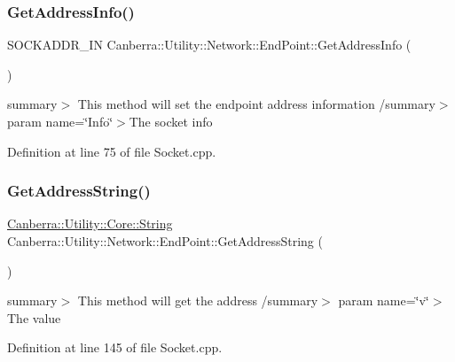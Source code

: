 \subsubsection{\texorpdfstring{Get\+Address\+Info()}{GetAddressInfo()}}
{\footnotesize\ttfamily S\+O\+C\+K\+A\+D\+D\+R\+\_\+\+IN Canberra\+::\+Utility\+::\+Network\+::\+End\+Point\+::\+Get\+Address\+Info (\begin{DoxyParamCaption}{ }\end{DoxyParamCaption})}

summary$>$ This method will set the endpoint address information /summary$>$ param name=\char`\"{}\+Info\char`\"{}$>$The socket info

Definition at line 75 of file Socket.\+cpp.

\mbox{\label{class_canberra_1_1_utility_1_1_network_1_1_end_point_ae2c218f6bc7af23d526d9f7fd581a847_ae2c218f6bc7af23d526d9f7fd581a847}} 
\subsubsection{\texorpdfstring{Get\+Address\+String()}{GetAddressString()}}
{\footnotesize\ttfamily \hyperlink{class_canberra_1_1_utility_1_1_core_1_1_string}{Canberra\+::\+Utility\+::\+Core\+::\+String} Canberra\+::\+Utility\+::\+Network\+::\+End\+Point\+::\+Get\+Address\+String (\begin{DoxyParamCaption}{ }\end{DoxyParamCaption})}

summary$>$ This method will get the address /summary$>$ param name=\char`\"{}v\char`\"{}$>$The value

Definition at line 145 of file Socket.\+cpp.

\mbox{\label{class_canberra_1_1_utility_1_1_network_1_1_end_point_aa39fe8e11e2dc2bff4aaa8f76a0d8d93_aa39fe8e11e2dc2bff4aaa8f76a0d8d93}} 
